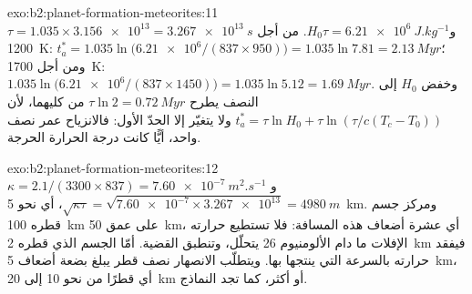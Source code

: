 \begin{solution}{exo:b2:planet-formation-meteorites:11}
$\tau = 1.035\times\num{3.156e13} = \qty{3.267e13}{s}$
و$H_0\tau = \qty{6.21e6}{J.kg^{-1}}$. من أجل \qty{1200}{K}:
$t_a^* = 1.035\ln\bigl(\num{6.21e6}/(837\times950)\bigr) = 1.035\ln7.81 =
\qty{2.13}{Myr}$؛ ومن أجل \qty{1700}{K}: $1.035\ln\bigl(\num{6.21e6}/(837\times1450)\bigr)
= 1.035\ln5.12 = \qty{1.69}{Myr}$. وخفض $H_0$ إلى النصف يطرح $\tau\ln2 =
\qty{0.72}{Myr}$ من كليهما، لأن $t_a^* = \tau\ln H_0 + \tau\ln(\tau/c(T_c -
T_0))$ ولا يتغيّر إلا الحدّ الأول: فالانزياح عمر نصف واحد، أيًّا كانت
درجة الحرارة الحرجة.
\end{solution}

\begin{solution}{exo:b2:planet-formation-meteorites:12}
$\kappa = 2.1/(3300\times837) = \qty{7.60e-7}{m^2.s^{-1}}$
و$\sqrt{\kappa\tau} = \sqrt{\num{7.60e-7}\times\num{3.267e13}} = \qty{4980}{m}$،
أي نحو \qty{5}{km}. ومركز جسم قطره \qty{100}{km} على عمق \qty{50}{km}،
أي عشرة أضعاف هذه المسافة: فلا تستطيع حرارته الإفلات ما دام الألومنيوم 26 يتحلّل،
وتنطبق القضية. أمّا الجسم الذي قطره \qty{2}{km} فيفقد حرارته بالسرعة التي
ينتجها بها. ويتطلّب الانصهار نصف قطر يبلغ بضعة أضعاف \qty{5}{km}، أي قطرًا من
نحو 10 إلى \qty{20}{km} أو أكثر، كما تجد النماذج.
\end{solution}

